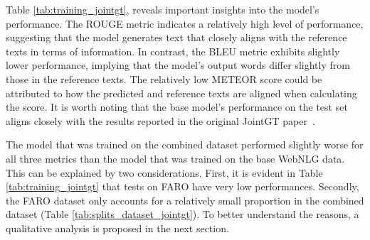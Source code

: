 \documentclass[
hf, %
]{ceurart}
\begin{document}
Table \ref{tab:training_jointgt}, reveals important insights into the model's performance. The ROUGE metric indicates a relatively high level of performance, suggesting that the model generates text that closely aligns with the reference texts in terms of information. In contrast, the BLEU metric exhibits slightly lower performance, implying that the model's output words differ slightly from those in the reference texts. The relatively low METEOR score could be attributed to how the predicted and reference texts are aligned when calculating the score. It is worth noting that the base model's performance on the test set aligns closely with the results reported in the original JointGT paper~\cite{JointGT}.

The model that was trained on the combined dataset performed slightly worse for all three metrics than the model that was trained on the base WebNLG data. This can be explained by two considerations. First, it is evident in Table \ref{tab:training_jointgt} that tests on FARO have very low performances. Secondly, the FARO dataset only accounts for a relatively small proportion in the combined dataset (Table \ref{tab:splits_dataset_jointgt}). To better understand the reasons, a qualitative analysis is proposed in the next section.
\end{document}
